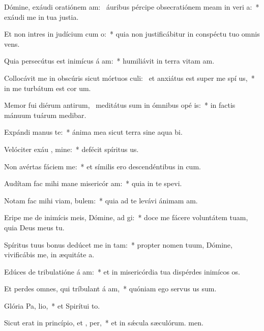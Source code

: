 \item Dómine, exáudi oratiónem am:~\pscross{} áuribus pércipe obsecratiónem meam in veri a:~* exáudi me in tua justia.
\item Et non intres in judícium cum  o:~* quia non justificábitur in conspéctu tuo omnis vens.
\item Quia persecútus est inimícus á am:~* humiliávit in terra vitam am.
\item Collocávit me in obscúris sicut mórtuos culi:~\pscross{} et anxiátus est super me spí us,~* in me turbátum est cor um.
\item Memor fui diérum antirum,~\pscross{} meditátus sum in ómnibus opé is:~* in factis mánuum tuárum medibar.
\item Expándi manus   te:~* ánima mea sicut terra sine aqua bi.
\item Velóciter exáu , mine:~* defécit spíritus us.
\item Non avértas fáciem   me:~* et símilis ero descendéntibus in cum.
\item Audítam fac mihi mane misericór am:~* quia in te spevi.
\item Notam fac mihi viam,   bulem:~* quia ad te levávi ánimam am.
\item Eripe me de inimícis meis, Dómine, ad  gi:~* doce me fácere voluntátem tuam, quia Deus meus  tu.
\item Spíritus tuus bonus dedúcet me in  tam:~* propter nomen tuum, Dómine, vivificábis me, in æquitáte a.
\item Edúces de tribulatióne á am:~* et in misericórdia tua dispérdes inimícos os.
\item Et perdes omnes, qui tríbulant á am,~* quóniam ego servus us sum.
\item Glória Pa,  lio,~* et Spirítui to.
\item Sicut erat in princípio, et ,  per,~* et in sǽcula sæculórum. men.
